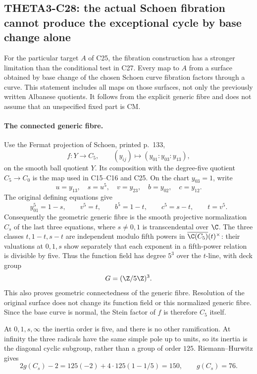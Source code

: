 \subsection{THETA3-C28: the actual Schoen fibration cannot produce the exceptional cycle by base change alone}\label{C28}

For the particular target $A$ of C25, the fibration
construction has a stronger limitation than the conditional
test in C27.  Every map to $A$ from a surface obtained by
base change of the chosen Schoen curve fibration factors
through a curve.  This statement includes all maps on
those surfaces, not only the previously written Albanese
quotients.  It follows from the explicit generic fibre
and does not assume that an unspecified fixed part is CM.

\paragraph{The connected generic fibre.}
Use the Fermat projection of Schoen, printed p.~133,
\[
     f:Y\longrightarrow C_5,\qquad
             (y_{ij})\longmapsto(y_{01}:y_{03}:y_{13}),
\]
on the smooth ball quotient $Y$.  Its composition with
the degree-five quotient $C_5\to C_0$ is the map used
in C15--C16 and C25.  On the chart $y_{03}=1$, write
\[
 u=y_{13},\quad s=u^5,\quad v=y_{23},\quad
 b=y_{02},\quad c=y_{12}.
\]
The original defining equations give
\[
 y_{01}^5=1-s,\qquad
 v^5=t,\qquad b^5=1-t,\qquad c^5=s-t,
                  \qquad t=v^5.                 \tag{C28a}
\]
Consequently the geometric generic fibre is the smooth
projective normalization $C_s$ of the last three equations,
where $s\ne0,1$ is transcendental over $\C$.
The three classes $t,1-t,s-t$ are independent modulo fifth
powers in $\overline{\C(C_5)}(t)^\times$:
their valuations at $0,1,s$ show separately that each
exponent in a fifth-power relation is divisible by five.
Thus the function field has degree $5^3$ over the
$t$-line, with deck group
\[
                         G=(\Z/5\Z)^3.
\]
This also proves geometric connectedness of the generic
fibre.  Resolution of the original surface does not change
its function field or this normalized generic fibre.
Since the base curve is normal, the Stein factor of $f$
is therefore $C_5$ itself.

At $0,1,s,\infty$ the inertia order is five, and there
is no other ramification.  At infinity the three radicals
have the same simple pole up to units, so its inertia is
the diagonal cyclic subgroup, rather than a group of
order $125$.  Riemann--Hurwitz gives
\[
 2g(C_s)-2=125(-2)+4\cdot125(1-1/5)=150,
                     \qquad g(C_s)=76.          \tag{C28b}
\]

